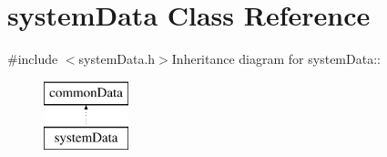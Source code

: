 \hypertarget{classsystem_data}{
\section{systemData Class Reference}
\label{classsystem_data}
}


{\ttfamily \#include $<$systemData.h$>$}Inheritance diagram for systemData::\begin{figure}[H]
\begin{center}
\leavevmode
\includegraphics[height=2cm]{classsystem_data}
\end{center}
\end{figure}
